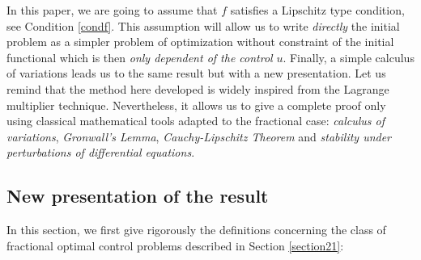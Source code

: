\documentclass[english,11pt,reqno]{smfart}
\begin{document}
In this paper, we are going to assume that $f$ satisfies a Lipschitz type condition, see Condition \eqref{condf}. This assumption will allow us to write \textit{directly} the initial problem as a simpler problem of optimization without constraint of the initial functional which is then \textit{only dependent of the control} $u$. Finally, a simple calculus of variations leads us to the same result but with a new presentation. Let us remind that the method here developed is widely inspired from the Lagrange multiplier technique. Nevertheless, it allows us to give a complete proof only using classical mathematical tools adapted to the fractional case: \textit{calculus of variations}, \textit{Gronwall's Lemma}, \textit{Cauchy-Lipschitz Theorem} and \textit{stability under perturbations of differential equations}.

\subsection{New presentation of the result}\label{section22}
In this section, we first give rigorously the definitions concerning the class of fractional optimal control problems described in Section \ref{section21}:
\end{document}
